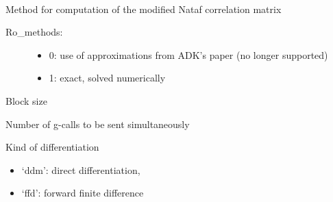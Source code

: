 \documentclass[letterpaper,10pt,english]{sphinxmanual}
\begin{document}
\begin{fulllineitems}
\label{model:pyre.model.AnalysisOptions}~

\begin{fulllineitems}
\label{model:pyre.model.AnalysisOptions.Ro_method}
Method for computation of the modified Nataf correlation matrix
\begin{description}
\item[{Ro\_methods:}] \leavevmode\begin{itemize}
\item {} 
0: use of approximations from ADK's paper (no longer supported)

\item {} 
1: exact, solved numerically

\end{itemize}

\end{description}

\end{fulllineitems}


\begin{fulllineitems}
\label{model:pyre.model.AnalysisOptions.block_size}
Block size

Number of g-calls to be sent simultaneously

\end{fulllineitems}


\begin{fulllineitems}
\label{model:pyre.model.AnalysisOptions.differentation_modus}
Kind of differentiation
\begin{itemize}
\item {} 
`ddm': direct differentiation,

\item {} 
`ffd': forward finite difference

\end{itemize}

\end{fulllineitems}


\end{fulllineitems}
\end{document}
